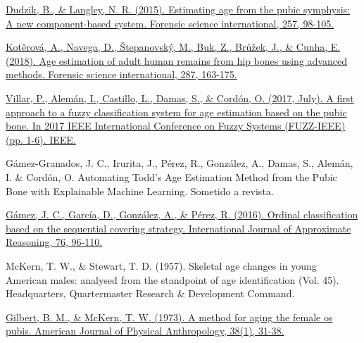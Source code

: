 \begin{thebibliography}{9}

	\href{https://www.sciencedirect.com/science/article/pii/S0379073815003254}{Dudzik, B., \& Langley, N. R. (2015). Estimating age from the pubic symphysis: A new component-based system. Forensic science international, 257, 98-105.}


	\href{https://www.sciencedirect.com/science/article/pii/S0379073818301440}{Kotěrová, A., Navega, D., Štepanovský, M., Buk, Z., Brůžek, J., \& Cunha, E. (2018). Age estimation of adult human remains from hip bones using advanced methods. Forensic science international, 287, 163-175.}



	\href{https://ieeexplore.ieee.org/abstract/document/8015760}{Villar, P., Alemán, I., Castillo, L., Damas, S., \& Cordón, O. (2017, July). A first approach to a fuzzy classification system for age estimation based on the pubic bone. In 2017 IEEE International Conference on Fuzzy Systems (FUZZ-IEEE) (pp. 1-6). IEEE.}


	Gámez-Granados, J. C., Irurita, J., Pérez, R., González, A., Damas, S., Alemán, I. \& Cordón, O. Automating Todd’s Age Estimation Method from the Pubic Bone with Explainable Machine Learning. Sometido a revista.


	\href{https://www.sciencedirect.com/science/article/pii/S0888613X16300706}{Gámez, J. C., García, D., González, A., \& Pérez, R. (2016). Ordinal classification based on the sequential covering strategy. International Journal of Approximate Reasoning, 76, 96-110.}



	McKern, T. W., \& Stewart, T. D. (1957). Skeletal age changes in young American males: analysed from the standpoint of age identification (Vol. 45). Headquarters, Quartermaster Research \& Development Command.


	\href{https://onlinelibrary.wiley.com/doi/abs/10.1002/ajpa.1330380109}{Gilbert, B. M., \& McKern, T. W. (1973). A method for aging the female os pubis. American Journal of Physical Anthropology, 38(1), 31-38.}


\end{thebibliography}
